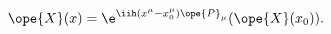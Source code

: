\begin{equation}	\label{12.118}
\ope{X}(x)
=
\e^{\iih(x^\mu-x_0^\mu)\ope{P}_{\mu}} (\ope{X}(x_0)).
	\end{equation}

